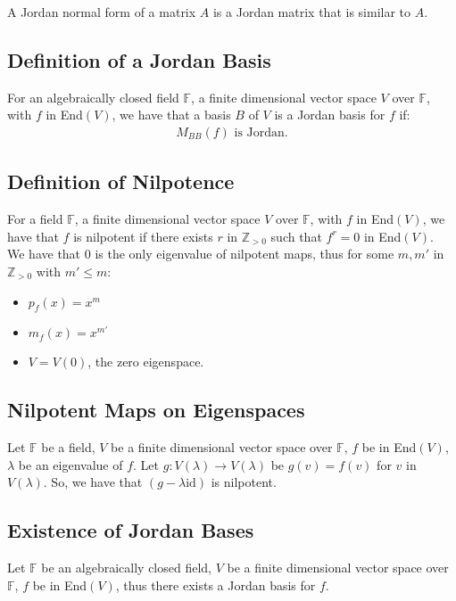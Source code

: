 \documentclass[a4paper, 12pt, twoside]{article}
\begin{document}
A Jordan normal form of a matrix $A$ is a Jordan matrix that is similar to $A$.

\subsection{Definition of a Jordan Basis}

For an algebraically closed field $\mathbb{F}$, a finite dimensional vector space $V$ over
$\mathbb{F}$, with $f$ in End$(V)$, we have that a basis $B$ of $V$ is a Jordan basis for
$f$ if: \begin{gather*}
  M_{BB}(f) \text{ is Jordan}.
\end{gather*}

\subsection{Definition of Nilpotence}

For a field $\mathbb{F}$, a finite dimensional vector space $V$ over $\mathbb{F}$, 
with $f$ in End$(V)$, we have that $f$ is nilpotent if there exists $r$ in $\mathbb{Z}_{>0}$ 
such that $f^r = 0$ in End$(V)$.
\\[\baselineskip]
We have that $0$ is the only eigenvalue of nilpotent maps, thus for some
$m, m'$ in $\mathbb{Z}_{>0}$ with $m' \leq m$: \begin{itemize}
  \item $p_f(x) = x^m$
  \item $m_f(x) = x^{m'}$
  \item $V = V(0)$, the zero eigenspace.
\end{itemize}

\subsection{Nilpotent Maps on Eigenspaces}

Let $\mathbb{F}$ be a field, $V$ be a finite dimensional vector space over $\mathbb{F}$, 
$f$ be in End$(V)$, $\lambda$ be an eigenvalue of $f$. Let $g: V(\lambda) \to V(\lambda)$
be $g(v) = f(v)$ for $v$ in $V(\lambda)$. So, we have that $(g - \lambda\text{id})$ is
nilpotent.

\subsection{Existence of Jordan Bases}

Let $\mathbb{F}$ be an algebraically closed field, $V$ be a finite dimensional 
vector space over $\mathbb{F}$, $f$ be in End$(V)$, thus there exists a Jordan
basis for $f$. 
\end{document}
